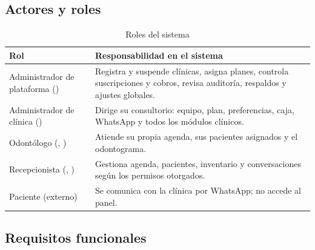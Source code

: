 \documentclass[11pt]{article}
\begin{document}
\subsection{Actores y roles}

\begin{table}[H]
\centering\small
\caption{Roles del sistema}\label{tab:roles}
\begin{tabularx}{\linewidth}{@{}P{3.6cm}L@{}}
\toprule
\textbf{Rol} & \textbf{Responsabilidad en el sistema} \\
\midrule
Administrador de plataforma () & Registra y suspende clínicas, asigna planes, controla suscripciones y cobros, revisa auditoría, respaldos y ajustes globales. \\
Administrador de clínica () & Dirige su consultorio: equipo, plan, preferencias, caja, WhatsApp y todos los módulos clínicos. \\
Odontólogo (, ) & Atiende su propia agenda, sus pacientes asignados y el odontograma. \\
Recepcionista (, ) & Gestiona agenda, pacientes, inventario y conversaciones según los permisos otorgados. \\
Paciente (externo) & Se comunica con la clínica por WhatsApp; no accede al panel. \\
\bottomrule
\end{tabularx}
\end{table}

\subsection{Requisitos funcionales}
\end{document}
